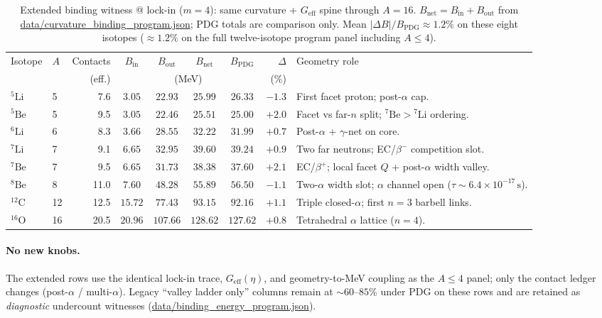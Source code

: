 \documentclass[11pt,notitlepage]{amsart}
\newcommand{\datafile}[1]{{\footnotesize\url{data/#1}}}
\newcommand{\fitbox}[1]{\begin{adjustbox}{max width=\linewidth,center}#1\end{adjustbox}}
\begin{document}
\begin{table}[h]
\centering
\caption{Extended binding witness @ lock-in ($m=4$): same curvature +
$G_{\mathrm{eff}}$ spine through $A=16$. $B_{\mathrm{net}}=B_{\mathrm{in}}+B_{\mathrm{out}}$
from \datafile{curvature_binding_program.json}; PDG totals are comparison only.
Mean $|\Delta B|/B_{\mathrm{PDG}}\approx 1.2\%$ on these eight isotopes
($\approx 1.2\%$ on the full twelve-isotope program panel including $A\le 4$).}
\label{tab:extended-panel}
\fitbox{%
\footnotesize
\setlength{\tabcolsep}{3pt}
\begin{tabularx}{\linewidth}{@{}llrccccr>{\RaggedRight\arraybackslash}X@{}}
\toprule
Isotope & $A$ & Contacts & $B_{\mathrm{in}}$ & $B_{\mathrm{out}}$ & $B_{\mathrm{net}}$ &
  $B_{\mathrm{PDG}}$ & $\Delta$ & Geometry role \\
& & (eff.) & \multicolumn{4}{c}{(MeV)} & (\%) & \\
\midrule
$^5\mathrm{Li}$  & 5  & 7.6  & $3.05$ & $22.93$ & $25.99$ & $26.33$ & $-1.3$ &
  First facet proton; post-$\alpha$ cap. \\
$^5\mathrm{Be}$ & 5  & 9.5  & $3.05$ & $22.46$ & $25.51$ & $25.00$ & $+2.0$ &
  Facet vs far-$n$ split; $^7\mathrm{Be}>{}^7\mathrm{Li}$ ordering. \\
$^6\mathrm{Li}$ & 6  & 8.3  & $3.66$ & $28.55$ & $32.22$ & $31.99$ & $+0.7$ &
  Post-$\alpha$ + $\gamma$-net on core. \\
$^7\mathrm{Li}$ & 7  & 9.1  & $6.65$ & $32.95$ & $39.60$ & $39.24$ & $+0.9$ &
  Two far neutrons; EC/$\beta^-$ competition slot. \\
$^7\mathrm{Be}$ & 7  & 9.5  & $6.65$ & $31.73$ & $38.38$ & $37.60$ & $+2.1$ &
  EC/$\beta^+$; local facet $Q$ + post-$\alpha$ width valley. \\
$^8\mathrm{Be}$ & 8  & 11.0 & $7.60$ & $48.28$ & $55.89$ & $56.50$ & $-1.1$ &
  Two-$\alpha$ width slot; $\alpha$ channel open ($\tau\sim 6.4\times 10^{-17}\,\mathrm{s}$). \\
$^{12}\mathrm{C}$ & 12 & 12.5 & $15.72$ & $77.43$ & $93.15$ & $92.16$ & $+1.1$ &
  Triple closed-$\alpha$; first $n=3$ barbell links. \\
$^{16}\mathrm{O}$ & 16 & 20.5 & $20.96$ & $107.66$ & $128.62$ & $127.62$ & $+0.8$ &
  Tetrahedral $\alpha$ lattice ($n=4$). \\
\bottomrule
\end{tabularx}}
\end{table}

\paragraph{No new knobs.}
The extended rows use the identical lock-in trace, $G_{\mathrm{eff}}(\eta)$, and
geometry-to-MeV coupling as the $A\le 4$ panel; only the contact ledger changes
(post-$\alpha$ / multi-$\alpha$). Legacy ``valley ladder only'' columns remain at
$\sim 60$--$85\%$ under PDG on these rows and are retained as \emph{diagnostic}
undercount witnesses (\datafile{binding_energy_program.json}).
\end{document}
